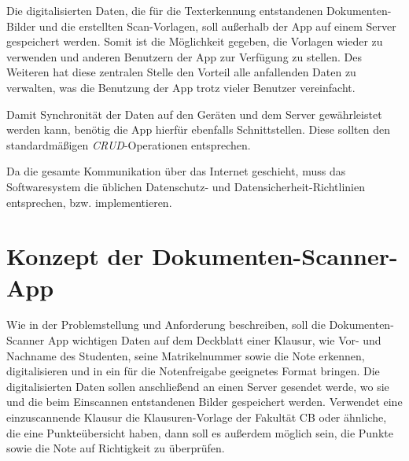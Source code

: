 \documentclass[nomenclature, oneside, 150]{HSMW-Thesis}
\begin{document}
	Die digitalisierten Daten, die für die Texterkennung entstandenen Dokumenten-Bilder und die erstellten Scan-Vorlagen, soll außerhalb der App auf einem Server gespeichert werden. Somit ist die Möglichkeit gegeben, die Vorlagen wieder zu verwenden und anderen Benutzern der App zur Verfügung zu stellen. Des Weiteren hat diese zentralen Stelle den Vorteil alle anfallenden Daten zu verwalten, was die Benutzung der App trotz vieler Benutzer vereinfacht.
	
	Damit Synchronität der Daten auf den Geräten und dem Server gewährleistet werden kann, benötig die App hierfür ebenfalls Schnittstellen. Diese sollten den standardmäßigen \textit{CRUD}-Operationen entsprechen. 
	
	Da die gesamte Kommunikation über das Internet geschieht, muss das Softwaresystem die üblichen Datenschutz- und Datensicherheit-Richtlinien entsprechen, bzw. implementieren. 


\chapter{Konzept der Dokumenten-Scanner-App}\label{ch:konzept}

	Wie in der Problemstellung und Anforderung beschreiben, soll die Dokumenten-Scanner App wichtigen Daten auf dem Deckblatt einer Klausur, wie Vor- und Nachname des Studenten, seine Matrikelnummer sowie die Note erkennen, digitalisieren und in ein für die Notenfreigabe geeignetes Format bringen. Die digitalisierten Daten sollen anschließend an einen Server gesendet werde, wo sie und die beim Einscannen entstandenen Bilder gespeichert werden. Verwendet eine einzuscannende Klausur die Klausuren-Vorlage der Fakultät CB oder ähnliche, die eine Punkteübersicht haben, dann soll es außerdem möglich sein, die Punkte sowie die Note auf Richtigkeit zu überprüfen. 
\end{document}
